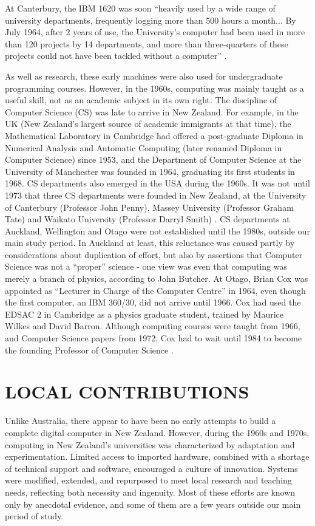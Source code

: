 \documentclass{IEEEcsmag}
\begin{document}
At Canterbury, the IBM 1620 was soon “heavily used by a wide range of university departments, frequently logging more than 500 hours a month... By July
1964, after 2 years of use, the University’s computer had been used in more than 120 projects by 14 departments,
and more than three-quarters of these projects could not have been tackled without a computer” \cite{Dale-Canty2}.

As well as research, these early machines were also used for undergraduate programming courses. However, in the 1960s, computing was mainly taught as a useful skill, not as an academic subject in its own right. The discipline of Computer Science (CS) was late to arrive in New Zealand. For example, in the UK (New Zealand's largest source of academic immigrants at that time), the Mathematical Laboratory in Cambridge had offered a post-graduate Diploma in Numerical Analysis and Automatic Computing (later renamed Diploma in Computer Science) since 1953, and the Department of Computer Science at the University of Manchester was founded in 1964, graduating its first students in 1968. CS departments also emerged in the USA during the 1960s. It was not until 1973 that three CS departments were founded in New Zealand, at the University of Canterbury (Professor John Penny),  Massey University (Professor Graham Tate) and Waikato University (Professor Darryl Smith) \cite{Bell, Waikato-50}.
CS departments at Auckland, Wellington and Otago were not established until the 1980s, outside our main study period. In Auckland at least, this reluctance was caused partly by considerations about duplication of effort, but also by assertions that Computer Science was not a “proper” science - one view was even that computing was merely a branch of physics, according to John Butcher. At Otago, Brian Cox was appointed as “Lecturer in Charge of the Computer Centre” in 1964, even though the first computer, an IBM 360/30, did not arrive until 1966. Cox had used the EDSAC 2 in Cambridge as a physics graduate student, trained by Maurice Wilkes and David Barron. Although computing courses were taught from 1966, and Computer Science papers from 1972, Cox had to wait until 1984 to become the founding Professor of Computer Science \cite{Otago-history}.

\vspace*{-8pt}
\section{LOCAL CONTRIBUTIONS}

Unlike Australia, there appear to have been no early attempts to build a complete digital computer in New Zealand. However, during the 1960s and 1970s, computing in New Zealand’s universities was characterized by adaptation and experimentation. Limited access to imported hardware, combined with a shortage of technical support and software, encouraged a culture of innovation. Systems were modified, extended, and repurposed to meet local research and teaching needs, reflecting both necessity and ingenuity. Most of these efforts are known only by anecdotal evidence, and some of them are a few years outside our main period of study.
\end{document}
